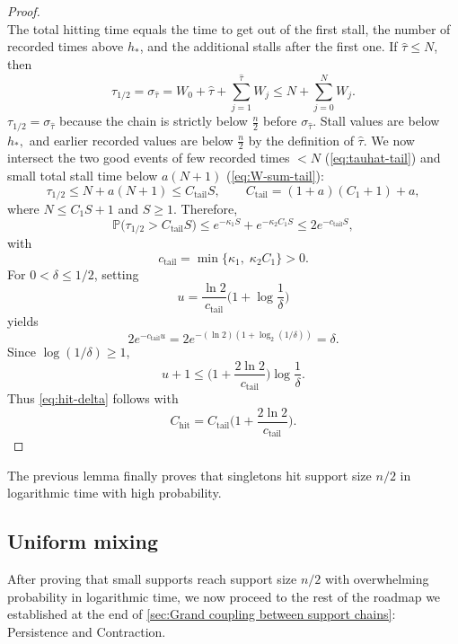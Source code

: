 \documentclass[
    aps,
    superscriptaddress,
    onecolumn,
    10pt,
    prx,
    nofootinbib
]{revtex4-2}
\theoremstyle{namedstatement}
\theoremstyle{plain}
\begin{document}
\begin{proof}
\\
The total hitting time equals the time to get out of the first stall, the number of recorded times above $h_*$, and the additional stalls after the first one. If $\widehat\tau\le N$, then
\begin{equation}
\tau_{1/2}=\sigma_{\widehat\tau}=W_0+\widehat\tau+\sum_{j=1}^{\widehat\tau}W_j
  \le N+\sum_{j=0}^{N}W_j.
\end{equation}
$\tau_{1/2}=\sigma_{\widehat{\tau}}$ because the chain is strictly below $\frac{n}{2}$ before $\sigma_{\widehat{\tau}}$. Stall values are below $h_*,$ and earlier recorded values are below $\frac{n}{2}$ by the definition of $\widehat{\tau}$. We now intersect the two good events of few recorded times $<N$ (\cref{eq:tauhat-tail}) and small total stall time below $a(N+1)$ (\cref{eq:W-sum-tail}):
\begin{equation}
  \tau_{1/2}\le N+a(N+1)\le C_{\mathrm{tail}}S,
  \qquad C_{\mathrm{tail}}=(1+a)(C_1+1)+a,
\end{equation}
where $N\le C_1S+1$ and $S\ge1$. Therefore,
\begin{equation}\label{eq:pre-tail}
  \mathbb P\big(\tau_{1/2}>C_{\mathrm{tail}}S\big)
  \le e^{-\kappa_1S}+e^{-\kappa_2C_1S}\le 2e^{-c_{\mathrm{tail}}S},
\end{equation}
with
\begin{equation}
  c_{\mathrm{tail}}=\min\{\kappa_1,\;\kappa_2C_1\}>0.
\end{equation}
For $0<\delta\le1/2$, setting
\begin{equation}
  u=\frac{\ln2}{c_{\mathrm{tail}}}\Big(1+\log\frac1\delta\Big)
\end{equation}
yields
\begin{equation}
  2e^{-c_{\mathrm{tail}}u}=2e^{-(\ln2)(1+\log_2(1/\delta))}=\delta.
\end{equation}
Since $\log(1/\delta)\ge1$,
\begin{equation}
  u+1\le\Big(1+\frac{2\ln2}{c_{\mathrm{tail}}}\Big)\log\frac1\delta.
\end{equation}
Thus \cref{eq:hit-delta} follows with
\begin{equation}
C_{\mathrm{hit}}=C_{\mathrm{tail}}\Big(1+\frac{2\ln2}{c_{\mathrm{tail}}}\Big).
\end{equation}
\end{proof}
The previous lemma finally proves that singletons hit support size $n/2$ in logarithmic time with high probability.
\newpage
\subsection{Uniform mixing}\label{sec:uniformmix}
After proving that small supports reach support size $n/2$ with overwhelming probability in logarithmic time, we now proceed to the rest of the roadmap we established at the end of \cref{sec:Grand coupling between support chains}: Persistence and Contraction.
\end{document}
